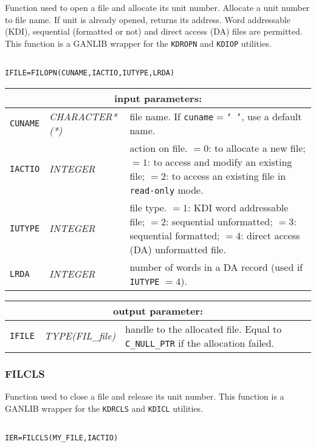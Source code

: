 Function used to open a file and allocate its unit number. Allocate a unit number to file
name. If unit is already opened, returns its address. Word addressable (KDI), sequential (formatted
or not) and direct access (DA) files are permitted.
This function is a GANLIB wrapper for the {\tt KDROPN} and {\tt KDIOP} utilities.

\begin{verbatim}

IFILE=FILOPN(CUNAME,IACTIO,IUTYPE,LRDA)
\end{verbatim}

\noindent
\begin{tabular}{|p{1.5cm}|p{3cm}|p{10cm}|}
\hline
\multicolumn{3}{|c|}{\bf input parameters:} \\
\hline
{\tt CUNAME} & {\it CHARACTER*(*)}  &  file name. If {\tt cuname}$=${\tt ' '}, use a default name. \\
\hline
{\tt IACTIO} & {\it INTEGER}  & action on file.
$=0$: to allocate a new file;
$=1$: to access and modify an existing file;
$=2$: to access an existing file in {\tt read-only} mode.  \\
\hline
{\tt IUTYPE} & {\it INTEGER}  & file type. 
$=1$:  KDI word addressable file;
$=2$:  sequential unformatted;
$=3$:  sequential formatted;
$=4$:  direct access (DA) unformatted file.  \\
\hline
{\tt LRDA} & {\it INTEGER}  & number of words in a DA record (used if {\tt IUTYPE} $= 4$).  \\
\hline
\end{tabular}

\vskip 0.4cm
\noindent
\begin{tabular}{|p{1.5cm}|p{3cm}|p{10cm}|}
\hline
\multicolumn{3}{|c|}{\bf output parameter:} \\
\hline
{\tt IFILE} & {\it TYPE(FIL\_file)}  & handle to the allocated file. Equal to {\tt C\_NULL\_PTR} if the allocation failed.  \\
\hline
\end{tabular}

\subsubsection{FILCLS}

Function used to close a file and release its unit number.
This function is a GANLIB wrapper for the {\tt KDRCLS} and {\tt KDICL} utilities.

\begin{verbatim}

IER=FILCLS(MY_FILE,IACTIO)
\end{verbatim}

